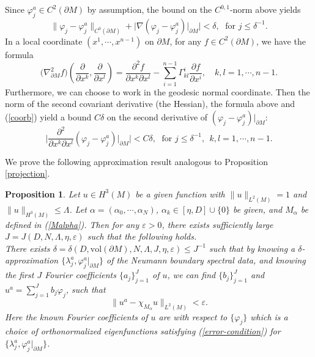 \documentclass[11pt,letterpaper]{amsart}
\numberwithin{equation}{section}
\theoremstyle{definition}
\theoremstyle{plain}
\theoremstyle{definition}
\theoremstyle{plain}
\newtheorem{measureerror}[u0]{Proposition}
\theoremstyle{definition}
\theoremstyle{plain}
\newcommand{\vol}{\textrm{vol}}
\begin{document}
Since $\varphi_j^{a}\in C^2(\partial M)$ by assumption, the bound on the $C^{0,1}$-norm above yields
\begin{equation}\label{close-C1}
 \|\varphi_j - \varphi_j^a \|_{C^{0}(\partial M)}+ \big|\nabla(\varphi_j - \varphi_j^a)|_{\partial M} \big|<\delta, \; \textrm{ for }j\leqslant \delta^{-1}.
\end{equation}
In a local coordinate $(x^1,\cdots,x^{n-1})$ on $\partial M$, for any $f\in C^2(\partial M)$, we have the formula
$$\big(\nabla_{\partial M}^2 f\big)(\frac{\partial}{\partial x^{k}},\frac{\partial}{\partial x^{l}})=\frac{\partial^2 f}{\partial x^{k} \partial x^l} -\sum_{i=1}^{n-1} \Gamma_{kl}^i \frac{\partial f}{\partial x^i}, \quad k,l=1,\cdots,n-1.$$
Furthermore, we can choose to work in the geodesic normal coordinate. Then the norm of the second covariant derivative (the Hessian), the formula above and (\ref{coorb}) yield a bound $C\delta$ on the second derivative of $(\varphi_j- \varphi_j^a)|_{\partial M}$:
\begin{equation}\label{close-C2}
\big|\frac{\partial^2}{\partial x^k \partial x^l} (\varphi_j- \varphi_j^a)|_{\partial M}\big| < C\delta, \; \textrm{ for }j\leqslant \delta^{-1}, \;\, k,l=1,\cdots,n-1.
\end{equation}


We prove the following approximation result analogous to Proposition \ref{projection}.

\begin{measureerror}\label{measureerror}
Let $u\in H^3(M)$ be a given function with $\|u\|_{L^2(M)}=1$ and $\|u\|_{H^3(M)}\leqslant \Lambda$. Let $\alpha=(\alpha_0,\cdots,\alpha_N)$, $\alpha_k\in [\eta, D]\cup\{0\}$ be given, and $M_{\alpha}$ be defined in (\ref{Malpha}). Then for any $\varepsilon>0$, there exists sufficiently large $J=J(D,N,\Lambda,\eta,\varepsilon)$ such that the following holds. \\
There exists $\delta=\delta(D, \vol(\partial M),N,\Lambda,J,\eta,\varepsilon)\leqslant J^{-1}$ such that by knowing a $\delta$-approximation $\{\lambda^a_j,\varphi^a_j|_{\partial M}\}$ of the Neumann boundary spectral data, and knowing the first $J$ Fourier coefficients $\{a_j\}_{j=1}^J$ of $u$, we can find $\{b_j\}_{j=1}^{J}$ and $u^a=\sum_{j=1}^{J}b_j \varphi_j$, such that
$$\|u^a-\chi_{M_{\alpha}}u\|_{L^2(M)} <\varepsilon.$$
Here the known Fourier coefficients of $u$ are with respect to $\{\varphi_j\}$ which is a choice of orthonormalized eigenfunctions satisfying (\ref{error-condition}) for $\{\lambda^a_j,\varphi^a_j|_{\partial M}\}$.
\end{measureerror}
\end{document}
